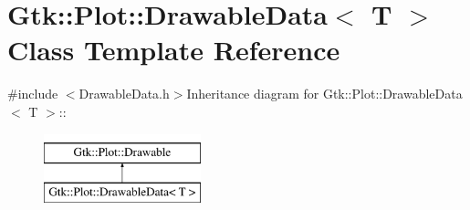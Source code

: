 \hypertarget{classGtk_1_1Plot_1_1DrawableData}{
\section{Gtk::Plot::DrawableData$<$ T $>$ Class Template Reference}
\label{classGtk_1_1Plot_1_1DrawableData}
}


{\ttfamily \#include $<$DrawableData.h$>$}Inheritance diagram for Gtk::Plot::DrawableData$<$ T $>$::\begin{figure}[H]
\begin{center}
\leavevmode
\includegraphics[height=2cm]{classGtk_1_1Plot_1_1DrawableData}
\end{center}
\end{figure}
